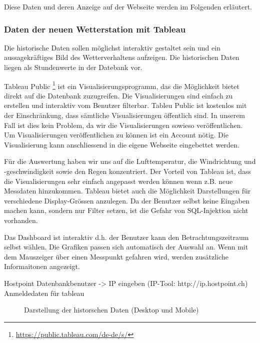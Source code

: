 Diese Daten und deren Anzeige auf der Webseite werden im Folgenden erläutert.



\subsubsection{Daten der neuen Wetterstation mit Tableau}\label{kap:Tableau}
Die historische Daten sollen möglichst interaktiv gestaltet sein und ein aussagekräftiges Bild des Wetterverhaltens aufzeigen. Die historischen Daten liegen als Stundenwerte in der Datebank vor.


Tableau Public \footnote{ \url{https://public.tableau.com/de-de/s/}} ist ein Visualisierungsprogramm, das die Möglichkeit bietet direkt auf die Datenbank zuzugreifen. Die Visualisierungen sind einfach zu erstellen und interaktiv vom Benutzer filterbar.
Tableu Public ist kostenlos mit der Einschränkung, dass sämtliche Visualisierungen öffentlich sind. In unserem Fall ist dies kein Problem, da wir die Visualisierungen sowieso veröffentlichen. Um Visualisierungen veröffentlichen zu können ist ein Account nötig. Die Visualisierung kann anschliessend in die eigene Webseite eingebettet werden.

Für die Auswertung haben wir uns auf die Lufttemperatur, die Windrichtung und -geschwindigkeit sowie den Regen konzentriert.
Der Vorteil von Tableau ist, dass die Visualisierungen sehr einfach angepasst werden können wenn z.B. neue Messdaten hinzukommen. Tableau bietet auch die Möglichkeit Darstellungen für verschiedene Display-Grössen anzulegen. Da der Benutzer selbst keine Eingaben machen kann, sondern nur Filter setzen, ist die Gefahr von SQL-Injektion nicht vorhanden.


Das Dashboard ist interaktiv d.h. der Benutzer kann den Betrachtungszeitraum selbst wählen. Die Grafiken passen sich automatisch der Auswahl an.
Wenn mit dem Mauszeiger über einen Messpunkt gefahren wird, werden zusätzliche Informaitonen angezeigt.


Hostpoint
Datenbankbenutzer -> IP eingeben (IP-Tool: http://ip.hostpoint.ch)
Anmeldedaten für tableau


\begin{figure}[h!]
	\centering
	\caption{Darstellung der historschen Daten (Desktop und Mobile)}
	\label{img:tableau}
\end{figure}


